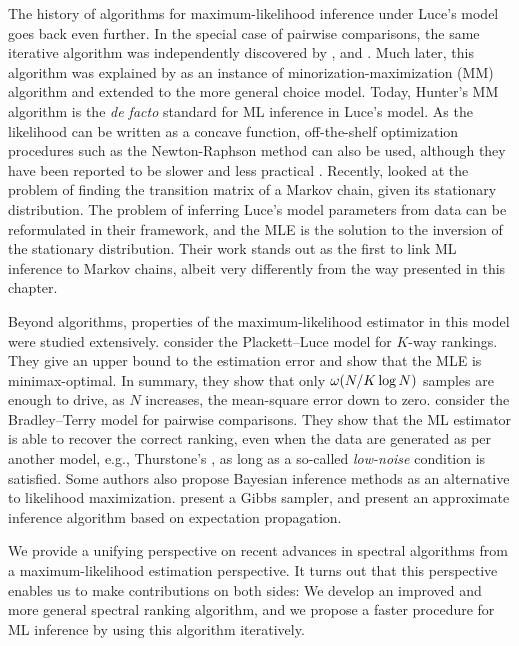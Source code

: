 The history of algorithms for maximum-likelihood inference under Luce's model goes back even further.
In the special case of pairwise comparisons, the same iterative algorithm was independently discovered by \citet{zermelo1928berechnung}, \citet{ford1957solution} and \citet{dykstra1960rank}.
Much later, this algorithm was explained by \citet{hunter2004mm} as an instance of minorization-maximization (MM) algorithm and extended to the more general choice model.
Today, Hunter's MM algorithm is the \emph{de facto} standard for ML inference in Luce's model.
As the likelihood can be written as a concave function, off-the-shelf optimization procedures such as the Newton-Raphson method can also be used, although they have been reported to be slower and less practical \citep{hunter2004mm}.
Recently, \citet{kumar2015inverting} looked at the problem of finding the transition matrix of a Markov chain, given its stationary distribution.
The problem of inferring Luce's model parameters from data can be reformulated in their framework, and the MLE is the solution to the inversion of the stationary distribution.
Their work stands out as the first to link ML inference to Markov chains, albeit very differently from the way presented in this chapter.

Beyond algorithms, properties of the maximum-likelihood estimator in this model were studied extensively.
\citet{hajek2014minimax} consider the Plackett--Luce model for $K$-way rankings.
They give an upper bound to the estimation error and show that the MLE is minimax-optimal.
In summary, they show that only $\omega(N/K \log N)$ samples are enough to drive, as $N$ increases, the mean-square error down to zero.
\citet{rajkumar2014statistical} consider the Bradley--Terry model for pairwise comparisons.
They show that the ML estimator is able to recover the correct ranking, even when the data are generated as per another model, e.g., Thurstone's \citep{thurstone1927method}, as long as a so-called \emph{low-noise} condition is satisfied.
Some authors also propose Bayesian inference methods as an alternative to likelihood maximization.
\citet{caron2012efficient} present a Gibbs sampler, and \citet{guiver2009bayesian} present an approximate inference algorithm based on expectation propagation.

We provide a unifying perspective on recent advances in spectral algorithms \citep{negahban2012iterative, azari2013generalized} from a maximum-likelihood estimation perspective.
It turns out that this perspective enables us to make contributions on both sides:
We develop an improved and more general spectral ranking algorithm, and we propose a faster procedure for ML inference by using this algorithm iteratively.
